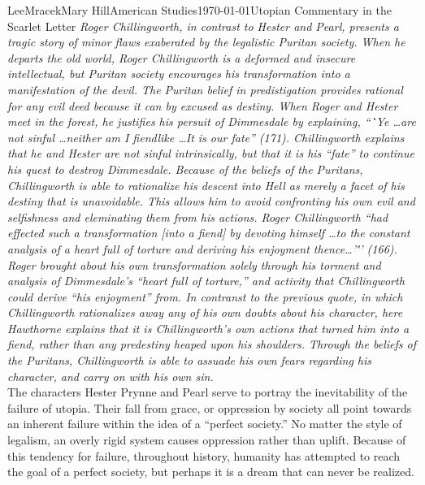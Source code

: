 \documentclass[12pt, letterpaper]{article}
\begin{document}
\begin{mla}{Lee}{Mracek}{Mary Hill}{American Studies}{\today}{Utopian Commentary in the Scarlet Letter}
        \textit{Roger Chillingworth, in contrast to Hester and Pearl, presents a tragic story of minor flaws exaberated by the legalistic Puritan society. When he departs the old world, Roger Chillingworth is a deformed and insecure intellectual, but Puritan society encourages his transformation into a manifestation of the devil. The Puritan belief in predistigation provides rational for any evil deed because it can by excused as destiny. When Roger and Hester meet in the forest, he justifies his persuit of Dimmesdale by explaining, ``\.`Ye \ldots are not sinful \ldots neither am I fiendlike \ldots It is our fate'' (171). Chillingworth explains that he and Hester are not sinful intrinsically, but that it is his ``fate'' to continue his quest to destroy Dimmesdale. Because of the beliefs of the Puritans, Chillingworth is able to rationalize his descent into Hell as merely a facet of his destiny that is unavoidable. This allows him to avoid confronting his own evil and selfishness and eleminating them from his actions. Roger Chillingworth ``had effected such a transformation [into a fiend] by devoting himself \ldots to the constant analysis of a heart full of torture and deriving his enjoyment thence\ldots '\.'' (166). Roger brought about his own transformation solely through his torment and analysis of Dimmesdale's ``heart full of torture,'' and activity that Chillingworth could derive ``his enjoyment'' from. In contranst to the previous quote, in which Chillingworth rationalizes away any of his own doubts about his character, here Hawthorne explains that it is Chillingworth's own actions that turned him into a fiend, rather than any predestiny heaped upon his shoulders. Through the beliefs of the Puritans, Chillingworth is able to assuade his own fears regarding his character, and carry on with his own sin.\\}
        The characters Hester Prynne and Pearl serve to portray the inevitability of the failure of utopia. Their fall from grace, or oppression by society all point towards an inherent failure within the idea of a ``perfect society.'' No matter the style of legalism, an overly rigid system causes oppression rather than uplift. Because of this tendency for failure, throughout history, humanity has attempted to reach the goal of a perfect society, but perhaps it is a dream that can never be realized.\\
\clearpage
\nocite{*}
\printbibliography
\end{mla}
\end{document}
